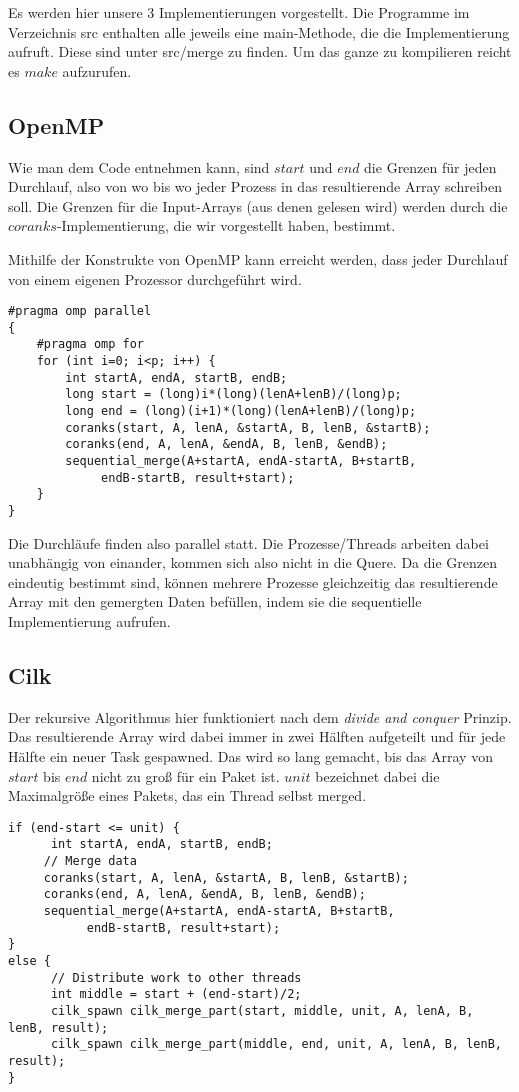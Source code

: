 Es werden hier unsere 3 Implementierungen vorgestellt. Die Programme im Verzeichnis src enthalten alle jeweils eine main-Methode, die die Implementierung aufruft. Diese sind unter src/merge zu finden. Um das ganze zu kompilieren reicht es $make$ aufzurufen. 

\subsection{OpenMP}
Wie man dem Code entnehmen kann, sind $start$ und $end$ die Grenzen für jeden Durchlauf, also von wo bis wo jeder Prozess in das resultierende Array schreiben soll. Die Grenzen für die Input-Arrays (aus denen gelesen wird) werden durch die $coranks$-Implementierung, die wir vorgestellt haben, bestimmt.

Mithilfe der Konstrukte von OpenMP kann erreicht werden, dass jeder Durchlauf von einem eigenen Prozessor durchgeführt wird. 
\begin{verbatim}
#pragma omp parallel
{
    #pragma omp for
    for (int i=0; i<p; i++) {
        int startA, endA, startB, endB;
        long start = (long)i*(long)(lenA+lenB)/(long)p;
        long end = (long)(i+1)*(long)(lenA+lenB)/(long)p;
        coranks(start, A, lenA, &startA, B, lenB, &startB);
        coranks(end, A, lenA, &endA, B, lenB, &endB);
        sequential_merge(A+startA, endA-startA, B+startB, 
             endB-startB, result+start);
    }
}
\end{verbatim}
Die Durchläufe finden also parallel statt. Die Prozesse/Threads arbeiten dabei unabhängig von einander, kommen sich also nicht in die Quere. Da die Grenzen eindeutig bestimmt sind, können mehrere Prozesse gleichzeitig das resultierende Array mit den gemergten Daten befüllen, indem sie die sequentielle Implementierung aufrufen.

\subsection{Cilk}
Der rekursive Algorithmus hier funktioniert nach dem \emph{divide and conquer} Prinzip. Das resultierende Array wird dabei immer in zwei Hälften aufgeteilt und für jede Hälfte ein neuer Task gespawned. Das wird so lang gemacht, bis das Array von $start$ bis $end$ nicht zu groß für ein Paket ist. $unit$ bezeichnet dabei die Maximalgröße eines Pakets, das ein Thread selbst merged.
\begin{verbatim}
if (end-start <= unit) {
      int startA, endA, startB, endB;
     // Merge data
     coranks(start, A, lenA, &startA, B, lenB, &startB);
     coranks(end, A, lenA, &endA, B, lenB, &endB);
     sequential_merge(A+startA, endA-startA, B+startB, 
           endB-startB, result+start);
}
else {
      // Distribute work to other threads
      int middle = start + (end-start)/2;
      cilk_spawn cilk_merge_part(start, middle, unit, A, lenA, B, lenB, result);
      cilk_spawn cilk_merge_part(middle, end, unit, A, lenA, B, lenB, result);
}
\end{verbatim}

